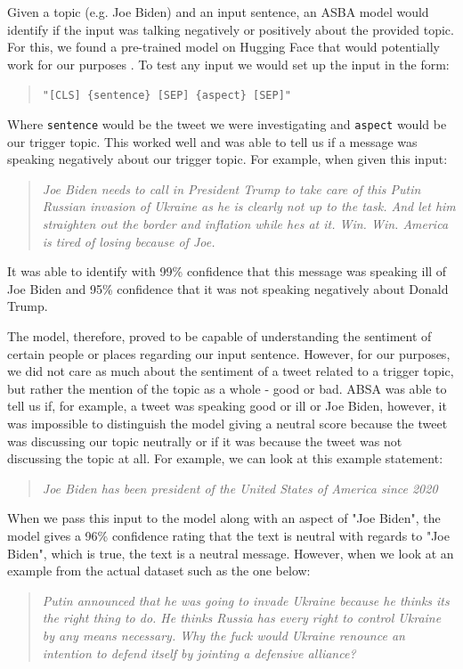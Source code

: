Given a topic (e.g. Joe Biden) and an input sentence, an ASBA model would identify if the input was talking negatively or positively about the provided topic. For this, we found a pre-trained model on Hugging Face that would potentially work for our purposes \cite{ABSA}. To test any input we would set up the input in the form:
\begin{quote}
    \verb|"[CLS] {sentence} [SEP] {aspect} [SEP]"|
\end{quote}
Where \verb|sentence| would be the tweet we were investigating and \verb|aspect| would be our trigger topic. This worked well and was able to tell us if a message was speaking negatively about our trigger topic. For example, when given this input:
\begin{quote}
    \textit{Joe Biden needs to call in President Trump to take care of this Putin Russian invasion of Ukraine as he is clearly not up to the task. And let him straighten out the border and inflation while hes at it. Win. Win. America is tired of losing because of Joe.}
\end{quote}
It was able to identify with 99\% confidence that this message was speaking ill of Joe Biden and 95\% confidence that it was not speaking negatively about Donald Trump.

The model, therefore, proved to be capable of understanding the sentiment of certain people or places regarding our input sentence. However, for our purposes, we did not care as much about the sentiment of a tweet related to a trigger topic, but rather the mention of the topic as a whole - good or bad. ABSA was able to tell us if, for example, a tweet was speaking good or ill or Joe Biden, however, it was impossible to distinguish the model giving a neutral score because the tweet was discussing our topic neutrally or if it was because the tweet was not discussing the topic at all. For example, we can look at this example statement:

\begin{quote}
    \textit{Joe Biden has been president of the United States of America since 2020}
\end{quote}

When we pass this input to the model along with an aspect of "Joe Biden", the model gives a 96\% confidence rating that the text is neutral with regards to "Joe Biden", which is true, the text is a neutral message. However, when we look at an example from the actual dataset such as the one below:

\begin{quote}
    \textit{Putin announced that he was going to invade Ukraine because he thinks its the right thing to do. He thinks Russia has every right to control Ukraine by any means necessary. Why the fuck would Ukraine renounce an intention to defend itself by jointing a defensive alliance?}
\end{quote}

